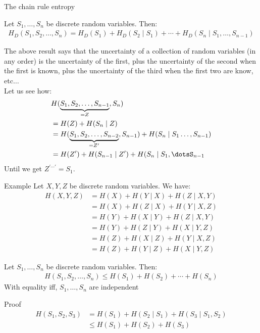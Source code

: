 \begin{parag}{The chain rule entropy}

    \begin{theoreme}
        Let $S_1, \dots, S_n$ be discrete random variables. Then:
        \begin{align*}
            H_D(S_1, S_2, \dots, S_n) = H_D(S_1) + H_D(S_2 \mid S_1) + \cdots + H_D(S_n \mid S_1, \dots, S_{n-1})
        \end{align*}
    \end{theoreme}

    The above result says that the uncertainty of a collection of random variables (in any order) is the uncertainty of the first, plus the uncertainty of the second when the first is known, plus the uncertainty of the third when the first two are know, etc$ \dots$
    \\
    Let us see how:
    \begin{align*}
       &H(\underbrace{S_1, S_2, \dots, S_{n-1}}_{=  Z}, S_n) \\
        &= H(Z) + H(S_n \mid Z)  \\
        &= H( \underbrace{S_1, S_2, \dots, S_{n-2}}_{= Z'}, S_{n-1}) + H(S_n \mid S_1 \dots, S_{n-1}) \\
        &= H(Z') + H(S_{n-1} \mid Z') + H(S_n \mid S_1, \dotsS_{n-1}
    \end{align*}
    Until we get $Z^{' \cdots'} = S_1$.
    
    \begin{subparag}{Example}
        Let $X, Y, Z$ be discrete random variables. We have:
        \begin{align*}
            H(X, Y, Z) &= H(X) + H(Y \mid X) + H(Z \mid  X, Y) \\
&= H(X) + H(Z \mid X) + H(Y \mid  X, Z) \\
&= H(Y) + H(X \mid Y) + H(Z \mid  X, Y) \\
&= H(Y) + H(Z \mid Y) + H(X \mid  Y, Z) \\
&= H(Z) + H(X \mid Z) + H(Y \mid  X, Z) \\
&= H(Z) + H(Y \mid Z) + H(X \mid  Y, Z) 
        \end{align*}
        
        
    \end{subparag}
    \begin{theoreme}
        Let $S_1, \dots, S_n$ be discrete random variables. Then:
        \begin{align*}
            H(S_1, S_2, \dots, S_n) \leq H(S_1) + H(S_2) + \cdots  + H(S_n)
        \end{align*}
        With equality iff, $S_1, \dots, S_n$ are independent
    \end{theoreme}
   \begin{subparag}{Proof}
        \begin{align*}
       H(S_1, S_2, S_3) &= H(S_1) + H(S_2 \mid  S_1) + H(S_3 \mid  S_1, S_2) \\
                         &\leq H(S_1) + H(S_2) + H(S_3)
   \end{align*}
   \end{subparag}
\end{parag}
